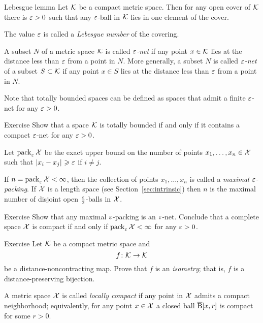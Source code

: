\begin{thm}{Lebesgue lemma}
Let $\mathcal{K}$ be a compact metric space.
Then for any open cover of $\mathcal{K}$ there is $\varepsilon>0$ such that any $\varepsilon$-ball in $\mathcal{K}$ lies in one element of the cover.

The value $\varepsilon$ is called a \emph{Lebesgue number} of the covering.
\end{thm}

A subset $N$ of a metric space $\mathcal{K}$ is called \emph{$\varepsilon$-net} if any point $x\in \mathcal{K}$ lies at the distance less than $\varepsilon$ from a point in $N$.
More generally, a subset $N$ is called \emph{$\varepsilon$-net} of a subset $S\subset\mathcal{K}$ if any point $x\in S$ lies at the distance less than $\varepsilon$ from a point in $N$. 

Note that totally bounded spaces can be defined as spaces that admit a finite $\varepsilon$-net for any $\varepsilon>0$.

\begin{thm}{Exercise}\label{ex:compact-net}
Show that a space $\mathcal{K}$ is totally bounded if and only if it contains a compact $\varepsilon$-net for any $\varepsilon>0$. 
\end{thm}


Let $\operatorname{\rm pack}\nolimits_\varepsilon\mathcal{X}$ be the exact upper bound on the number of points $x_1,\z\dots,x_n\in \spc{X}$ such that $\dist{x_i}{x_j}{}\ge\eps$ if $i\ne j$.

If $n=\operatorname{\rm pack}\nolimits_\varepsilon\mathcal{X}<\infty$, then
the collection of points $x_1,\dots,x_n$ is called a \emph{maximal $\varepsilon$-packing}.
If $\mathcal{X}$ is a length space (see Section~\ref{sec:intrinsic}) then $n$ is the maximal number of disjoint open $\tfrac{\varepsilon}2$-balls in $\mathcal{X}$.

\begin{thm}{Exercise}\label{ex:pack-net}
Show that any maximal $\varepsilon$-packing is an $\varepsilon$-net.
Conclude that a complete space $\mathcal{X}$ is compact if and only if $\pack_\eps\spc{X}\z<\infty$ for any $\varepsilon>0$.
\end{thm}


\begin{thm}{Exercise}\label{ex:non-contracting-map}
Let $\mathcal{K}$  be a compact metric space and
\[f\:\spc{K}\z\to \spc{K}\] 
be a distance-noncontracting map.
Prove that $f$ is an \emph{isometry};
that is, $f$ is a distance-preserving bijection.
\end{thm}

A metric space $\mathcal{X}$ is called \emph{locally compact} if any point in $\mathcal{X}$ admits a compact neighborhood;
equivalently, for any point $x\in\mathcal{X}$ a closed ball $\overline{\mathrm{B}}{}[x,r]$ is compact for some $r>0$.


